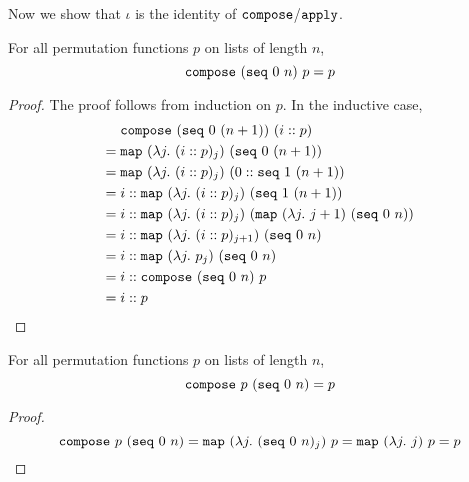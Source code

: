 \documentclass[sigplan,10pt,anonymous,review]{thesis}
\begin{document}
Now we show that $\iota$ is the identity of $\texttt{\textup{compose}}$/$\texttt{\textup{apply}}$.
\begin{theorem}[compose\_id\_l]
  For all permutation functions $p$ on lists of length $n$,
  \begin{equation*}
    \texttt{\textup{compose}}~(\texttt{\textup{seq}}~0~n)~p = p
  \end{equation*}
\end{theorem}
\begin{proof}
  The proof follows from induction on $p$. In the inductive case,
  \begin{align*}
     {}& \texttt{\textup{compose}}~(\texttt{\textup{seq}}~0~(n+1))~(i::p) \\
    ={}& \texttt{\textup{map}}~(\lambda j.~(i::p)_j)~(\texttt{\textup{seq}}~0~(n+1)) \\
    ={}& \texttt{\textup{map}}~(\lambda j.~(i::p)_j)~(0 :: \texttt{\textup{seq}}~1~(n+1)) \\
    ={}& i :: \texttt{\textup{map}}~(\lambda j.~(i::p)_j)~(\texttt{\textup{seq}}~1~(n+1)) \\
    ={}& i :: \texttt{\textup{map}}~(\lambda j.~(i::p)_j)~(\texttt{\textup{map}}~(\lambda j.~j+1)~(\texttt{\textup{seq}}~0~n)) \\
    ={}& i :: \texttt{\textup{map}}~(\lambda j.~(i::p)_{j+1})~(\texttt{\textup{seq}}~0~n) \\
    ={}& i :: \texttt{\textup{map}}~(\lambda j.~p_j)~(\texttt{\textup{seq}}~0~n) \\
    ={}& i :: \texttt{\textup{compose}}~(\texttt{\textup{seq}}~0~n)~p \\
    ={}& i :: p \qedhere
  \end{align*}
\end{proof}

\begin{theorem}[compose\_id\_r]
  For all permutation functions $p$ on lists of length $n$,
  \begin{equation*}
    \texttt{\textup{compose}}~p~(\texttt{\textup{seq}}~0~n) = p
  \end{equation*}
\end{theorem}
\begin{proof}
  \begin{equation*}
       \texttt{\textup{compose}}~p~(\texttt{\textup{seq}}~0~n)
    = \texttt{\textup{map}}~(\lambda j.~(\texttt{\textup{seq}}~0~n)_j)~p
    = \texttt{\textup{map}}~(\lambda j.~j)~p
    = p \qedhere
  \end{equation*}
\end{proof}
\end{document}
